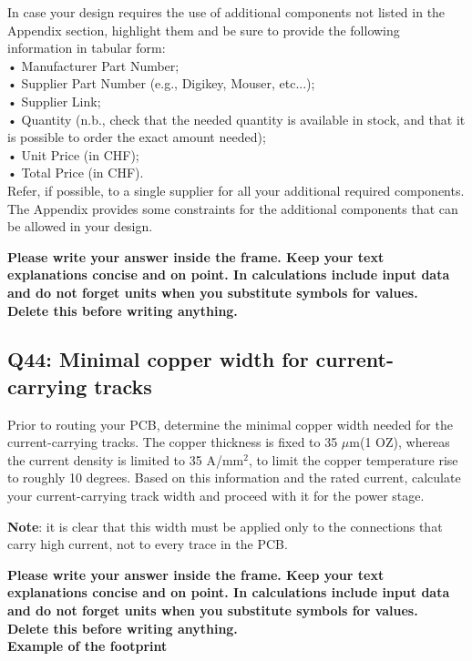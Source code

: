 \documentclass{PELsmallreport}
\begin{document}
In case your design requires the use of additional components not listed in the Appendix section, highlight them and be sure to provide
the following information in tabular form:\\
• Manufacturer Part Number;\\
• Supplier Part Number (e.g., Digikey, Mouser, etc...);\\
• Supplier Link;\\
• Quantity (n.b., check that the needed quantity is available in stock, and that it is possible to order the exact amount needed);\\
• Unit Price (in CHF);\\
• Total Price (in CHF).\\
Refer, if possible, to a single supplier for all your additional required components. The Appendix provides some constraints for the
additional components that can be allowed in your design.\\
\begin{framed}
	\vspace{2em}
	\textbf{Please write your answer inside the frame. Keep your text explanations concise and on point. In calculations include input data and do not forget units when you substitute symbols for values. \\ Delete this before writing anything.\\}
	\vspace{2em}
\end{framed}
\hfill{}

\subsection{Q44: Minimal copper width for current-carrying tracks}
Prior to routing your PCB, determine the minimal copper width needed for the current-carrying tracks. The copper thickness is fixed to
35 $\mu$m(1 OZ), whereas the current density is limited to 35 A/mm$^2$, to limit the copper temperature rise to roughly 10 degrees. Based on this information and the rated current, calculate your current-carrying track width and proceed with it for the power stage.


\textbf{Note}: it is clear that this width must be applied only to the connections that carry high current, not to every trace in the PCB. 
\begin{framed}
	\vspace{2em}
	\textbf{Please write your answer inside the frame. Keep your text explanations concise and on point. In calculations include input data and do not forget units when you substitute symbols for values. \\ Delete this before writing anything.\\ Example of the footprint}
	\vspace{2em}
\end{framed}
 \quad {} \hfill{}
\end{document}
